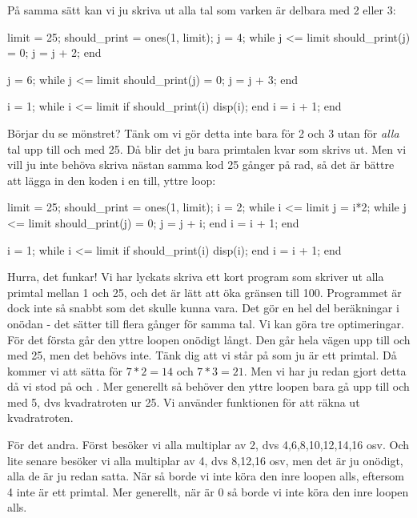 På samma sätt kan vi ju skriva ut alla tal som varken är delbara med 2 eller 3:
\vspace{10pt}

\begin{matlab}
limit = 25;
should_print = ones(1, limit);
j = 4;
while j <= limit
	should_print(j) = 0;
	j = j + 2;
end

j = 6;
while j <= limit
	should_print(j) = 0;
	j = j + 3;
end

i = 1;
while i <= limit
	if should_print(i)
		disp(i);
	end
	i = i + 1;
end
\end{matlab}

Börjar du se mönstret? Tänk om vi gör detta inte bara för 2 och 3 utan för \emph{alla} tal upp till och med 25. Då blir det ju bara primtalen kvar som skrivs ut. Men vi vill ju inte behöva skriva nästan samma kod 25 gånger på rad, så det är bättre att lägga in den koden i en till, yttre loop:
\vspace{10pt}

\begin{matlab}
limit = 25;
should_print = ones(1, limit);
i = 2;
while i <= limit
	j = i*2;
	while j <= limit
		should_print(j) = 0;
		j = j + i;
	end
	i = i + 1;
end

i = 1;
while i <= limit
	if should_print(i)
		disp(i);
	end
	i = i + 1;
end
\end{matlab}

Hurra, det funkar! Vi har lyckats skriva ett kort program som skriver ut alla primtal mellan 1 och 25, och det är lätt att öka gränsen till 100. Programmet är dock inte så snabbt som det skulle kunna vara. Det gör en hel del beräkningar i onödan - det sätter  till  flera gånger för samma tal. Vi kan göra tre optimeringar.
\newpage
För det första går den yttre loopen onödigt långt. Den går hela vägen upp till och med 25, men det behövs inte. Tänk dig att vi står på  som ju är ett primtal. Då kommer vi att sätta  för $7*2=14$ och $7*3=21$. Men vi har ju redan gjort detta då vi stod på  och . Mer generellt så behöver den yttre loopen bara gå upp till och med 5, dvs kvadratroten ur 25. Vi använder funktionen  för att räkna ut kvadratroten.

För det andra. Först besöker vi alla multiplar av 2, dvs 4,6,8,10,12,14,16 osv. Och lite senare besöker vi alla multiplar av 4, dvs 8,12,16 osv, men det är ju onödigt, alla de är ju redan satta. När  så borde vi inte köra den inre loopen alls, eftersom 4 inte är ett primtal. Mer generellt, när  är 0 så borde vi inte köra den inre loopen alls.

